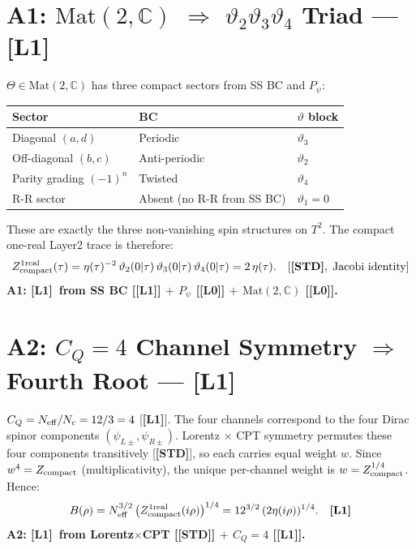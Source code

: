 \documentclass[12pt,a4paper]{article}
\theoremstyle{remark}\newtheorem{remark}[theorem]{Remark}
\newcommand{\Lz}{\textbf{[L0]}}
\newcommand{\Lo}{\textbf{[L1]}}
\newcommand{\STD}{\textbf{[STD]}}
\begin{document}
\section{A1: $\mathrm{Mat}(2,\mathbb C)$ $\Rightarrow$ $\vartheta_2\vartheta_3\vartheta_4$ Triad — \Lo}

$\Theta\in\mathrm{Mat}(2,\mathbb C)$ has three compact sectors from
SS BC and $P_\psi$:
\begin{center}
\begin{tabular}{lll}
\toprule
Sector & BC & $\vartheta$ block \\
\midrule
Diagonal $(a,d)$ & Periodic & $\vartheta_3$ \\
Off-diagonal $(b,c)$ & Anti-periodic & $\vartheta_2$ \\
Parity grading $(-1)^n$ & Twisted & $\vartheta_4$ \\
R-R sector & Absent (no R-R from SS BC) & $\vartheta_1=0$ \\
\bottomrule
\end{tabular}
\end{center}

These are exactly the three non-vanishing spin structures on $T^2$.
The compact one-real Layer2 trace is therefore:
\[
  Z_{\rm compact}^{1\rm real}(\tau)
  = \eta(\tau)^{-2}\,\vartheta_2(0|\tau)\,\vartheta_3(0|\tau)\,
  \vartheta_4(0|\tau)
  = 2\,\eta(\tau). \quad [\STD,\;\text{Jacobi identity}]
\]
\textbf{A1: \Lo\ from SS BC [\Lo] $+$ $P_\psi$ [\Lz] $+$
$\mathrm{Mat}(2,\mathbb C)$ [\Lz].}

\section{A2: $C_Q=4$ Channel Symmetry $\Rightarrow$ Fourth Root — \Lo}

$C_Q = N_{\rm eff}/N_c = 12/3 = 4$ [\Lo]. The four channels correspond
to the four Dirac spinor components $(\psi_{L\pm},\psi_{R\pm})$.
Lorentz $\times$ CPT symmetry permutes these four components
transitively [\STD], so each carries equal weight $w$.
Since $w^4 = Z_{\rm compact}$ (multiplicativity), the unique
per-channel weight is $w = Z_{\rm compact}^{1/4}$.
Hence:
\[
  B(\rho) = N_{\rm eff}^{3/2}\,\bigl(Z_{\rm compact}^{1\rm real}(i\rho)
  \bigr)^{1/4}
  = 12^{3/2}\,(2\eta(i\rho))^{1/4}. \quad \Lo
\]
\textbf{A2: \Lo\ from Lorentz$\times$CPT [\STD] $+$ $C_Q=4$ [\Lo].}
\end{document}
